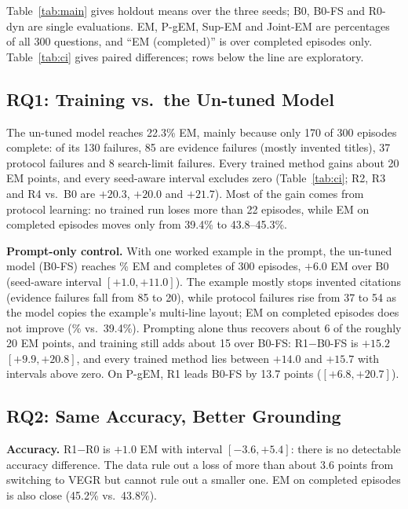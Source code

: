 \documentclass[conference]{IEEEtran}
\newcommand{\pgem}{P-gEM}
\begin{document}
Table~\ref{tab:main} gives holdout means over the three seeds; B0, B0-FS and R0-dyn are single evaluations. EM, \pgem, Sup-EM and Joint-EM are percentages of all 300 questions, and ``EM (completed)'' is over completed episodes only. Table~\ref{tab:ci} gives paired differences; rows below the line are exploratory.

\subsection{RQ1: Training vs.\ the Un-tuned Model}
The un-tuned model reaches 22.3\% EM, mainly because only 170 of 300 episodes complete: of its 130 failures, 85 are evidence failures (mostly invented titles), 37 protocol failures and 8 search-limit failures. Every trained method gains about 20 EM points, and every seed-aware interval excludes zero (Table~\ref{tab:ci}; R2, R3 and R4 vs.\ B0 are $+20.3$, $+20.0$ and $+21.7$). Most of the gain comes from protocol learning: no trained run loses more than 22 episodes, while EM on completed episodes moves only from 39.4\% to 43.8--45.3\%.

\textbf{Prompt-only control.} With one worked example in the prompt, the un-tuned model (B0-FS) reaches \FSem\% EM and completes \FSdone{} of 300 episodes, $+6.0$ EM over B0 (seed-aware interval $[+1.0,+11.0]$). The example mostly stops invented citations (evidence failures fall from 85 to 20), while protocol failures rise from 37 to 54 as the model copies the example's multi-line layout; EM on completed episodes does not improve (\FSemdone\% vs.\ 39.4\%). Prompting alone thus recovers about 6 of the roughly 20 EM points, and training still adds about 15 over B0-FS: R1$-$B0-FS is $+15.2$ $[+9.9,+20.8]$, and every trained method lies between $+14.0$ and $+15.7$ with intervals above zero. On \pgem, R1 leads B0-FS by 13.7 points ($[+6.8,+20.7]$).

\subsection{RQ2: Same Accuracy, Better Grounding}
\textbf{Accuracy.} R1$-$R0 is $+1.0$ EM with interval $[-3.6,+5.4]$: there is no detectable accuracy difference. The data rule out a loss of more than about 3.6 points from switching to VEGR but cannot rule out a smaller one. EM on completed episodes is also close (45.2\% vs.\ 43.8\%).
\end{document}

